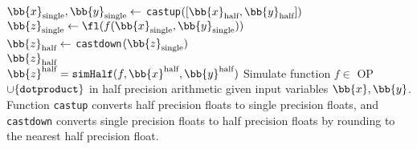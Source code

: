 
\begin{algorithm2e}[H]
	\DontPrintSemicolon %
	$\bb{x}_{\text{single}}, \bb{y}_{\text{single}} \gets$ {\tt castup}$([\bb{x}_{\text{half}},\bb{y}_{\text{half}}])$\\
	$\bb{z}_{\text{single}} \gets \fl(f(\bb{x}_{\text{single}}, \bb{y}_{\text{single}}))$\\
	$\bb{z}_{\text{half}} \gets$ {\tt castdown}$(\bb{z}_{\text{single}})$\\
	\Return $\bb{z}_{\text{half}}$\\
	\caption{$\bb{z}^{\text{half}} = {\tt simHalf}(f, \bb{x}^{\text{half}}, \bb{y}^{\text{half}})$ Simulate function $f\in$ OP$\cup \{{\tt dot product} \}$ in half precision arithmetic given input variables $\bb{x},\bb{y}$. Function {\tt castup} converts half precision floats to single precision floats, and {\tt castdown} converts single precision floats to half precision floats by rounding to the nearest half precision float.}
	\label{algo:simulate}
\end{algorithm2e}

